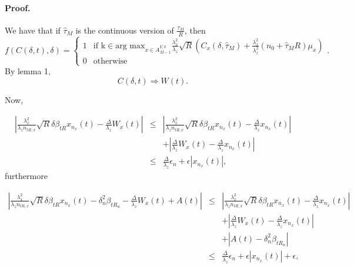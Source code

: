 \documentclass[12pt,english]{article}
\begin{document}
\paragraph*{Proof.}

We have that if $\hat{\tau}_{M}$ is the continuous version of $\frac{\tau_{M}}{R}$,
then 
\[
f\left(C\left(\delta,t\right),\delta\right)=\begin{cases}
1 & \mbox{if }\mbox{k}\in\mbox{arg max}_{x\in A_{M-1}^{Y,\delta}}\frac{\lambda_{x}^{2}}{\lambda_{z}}\sqrt{R}\left(C_{x}\left(\delta,\hat{\tau}_{M}\right)+\frac{\lambda_{x}^{2}}{\lambda_{z}^{2}}\left(n_{0}+\hat{\tau}_{M}R\right)\mu_{x}\right)\\
0 & \mbox{otherwise}
\end{cases}.
\]
By lemma 1,
\[
C\left(\delta,t\right)\Rightarrow W\left(t\right).
\]


Now,

\begin{eqnarray*}
\left|\frac{\lambda_{x}^{2}}{\lambda_{z}n_{tR,x}}\sqrt{R}\delta\beta_{tR}x_{n_{x}}\left(t\right)-\frac{\Delta}{\lambda_{z}}W_{x}\left(t\right)\right| & \leq & \left|\frac{\lambda_{x}^{2}}{\lambda_{z}n_{tR,x}}\sqrt{R}\delta\beta_{tR}x_{n_{x}}\left(t\right)-\frac{\Delta}{\lambda_{z}}x_{n_{x}}\left(t\right)\right|\\
 &  & +\left|\frac{\Delta}{\lambda_{z}}W_{x}\left(t\right)-\frac{\Delta}{\lambda_{z}}x_{n_{x}}\left(t\right)\right|\\
 & \leq & \frac{\Delta}{\lambda_{z}}\epsilon_{n}+\epsilon\left|x_{n_{x}}\left(t\right)\right|,
\end{eqnarray*}
furthermore

\begin{eqnarray*}
\left|\frac{\lambda_{x}^{2}}{\lambda_{z}n_{tR,x}}\sqrt{R}\delta\beta_{tR}x_{n_{x}}\left(t\right)-\delta_{n}^{2}\beta_{tR_{n}}-\frac{\Delta}{\lambda_{z}}W_{x}\left(t\right)+A\left(t\right)\right| & \leq & \left|\frac{\lambda_{x}^{2}}{\lambda_{z}n_{tR,x}}\sqrt{R}\delta\beta_{tR}x_{n_{x}}\left(t\right)-\frac{\Delta}{\lambda_{z}}x_{n_{x}}\left(t\right)\right|\\
 &  & +\left|\frac{\Delta}{\lambda_{z}}W_{x}\left(t\right)-\frac{\Delta}{\lambda_{z}}x_{n_{x}}\left(t\right)\right|\\
 &  & +\left|A\left(t\right)-\delta_{n}^{2}\beta_{tR_{n}}\right|\\
 & \leq & \frac{\Delta}{\lambda_{z}}\epsilon_{n}+\epsilon\left|x_{n_{x}}\left(t\right)\right|+\epsilon,
\end{eqnarray*}
\end{document}
